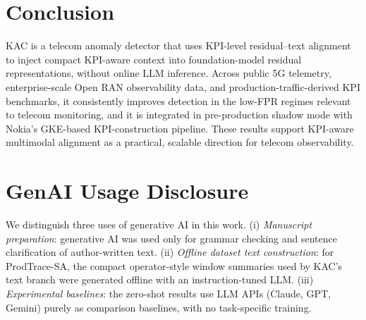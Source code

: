 \documentclass[conference]{IEEEtran}
\begin{document}
\section{Conclusion}

KAC is a telecom anomaly detector that uses KPI-level residual--text alignment to inject compact KPI-aware context into foundation-model residual representations, without online LLM inference. Across public 5G telemetry, enterprise-scale Open RAN observability data, and production-traffic-derived KPI benchmarks, it consistently improves detection in the low-FPR regimes relevant to telecom monitoring, and it is integrated in pre-production shadow mode with Nokia's GKE-based KPI-construction pipeline. These results support KPI-aware multimodal alignment as a practical, scalable direction for telecom observability.

\section*{GenAI Usage Disclosure}
We distinguish three uses of generative AI in this work. (i) \emph{Manuscript preparation}: generative AI was used only for grammar checking and sentence clarification of author-written text. (ii) \emph{Offline dataset text construction}: for ProdTrace-SA, the compact operator-style window summaries used by KAC's text branch were generated offline with an instruction-tuned LLM. (iii) \emph{Experimental baselines}: the zero-shot results use LLM APIs (Claude, GPT, Gemini) purely as comparison baselines, with no task-specific training.



\end{document}
